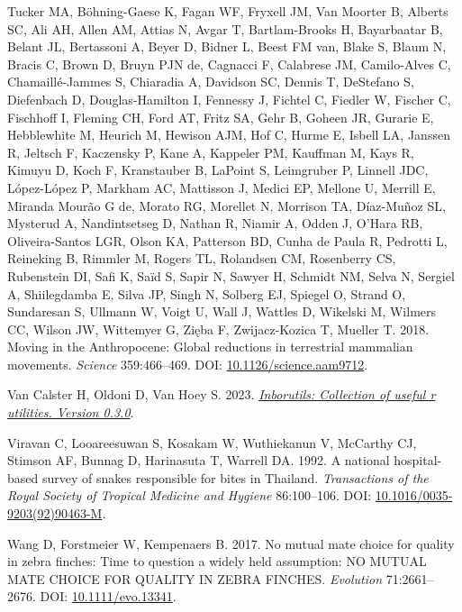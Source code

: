 \documentclass[10pt,a4paper]{article}
\newlength{\cslhangindent}
\newenvironment{CSLReferences}[2] %
 {\begin{list}{}{%
  \setlength{\itemindent}{0pt}
  \setlength{\leftmargin}{0pt}
  \setlength{\parsep}{0pt}
  \ifodd #1
   \setlength{\leftmargin}{\cslhangindent}
   \setlength{\itemindent}{-1\cslhangindent}
  \fi
  \setlength{\itemsep}{#2\baselineskip}}}
 {\end{list}}
\begin{document}
\begin{CSLReferences}{1}{0}
Tucker MA, Böhning-Gaese K, Fagan WF, Fryxell JM, Van Moorter B, Alberts SC, Ali AH, Allen AM, Attias N, Avgar T, Bartlam-Brooks H, Bayarbaatar B, Belant JL, Bertassoni A, Beyer D, Bidner L, Beest FM van, Blake S, Blaum N, Bracis C, Brown D, Bruyn PJN de, Cagnacci F, Calabrese JM, Camilo-Alves C, Chamaillé-Jammes S, Chiaradia A, Davidson SC, Dennis T, DeStefano S, Diefenbach D, Douglas-Hamilton I, Fennessy J, Fichtel C, Fiedler W, Fischer C, Fischhoff I, Fleming CH, Ford AT, Fritz SA, Gehr B, Goheen JR, Gurarie E, Hebblewhite M, Heurich M, Hewison AJM, Hof C, Hurme E, Isbell LA, Janssen R, Jeltsch F, Kaczensky P, Kane A, Kappeler PM, Kauffman M, Kays R, Kimuyu D, Koch F, Kranstauber B, LaPoint S, Leimgruber P, Linnell JDC, López-López P, Markham AC, Mattisson J, Medici EP, Mellone U, Merrill E, Miranda Mourão G de, Morato RG, Morellet N, Morrison TA, Díaz-Muñoz SL, Mysterud A, Nandintsetseg D, Nathan R, Niamir A, Odden J, O'Hara RB, Oliveira-Santos LGR, Olson KA, Patterson BD, Cunha de Paula R, Pedrotti L, Reineking B, Rimmler M, Rogers TL, Rolandsen CM, Rosenberry CS, Rubenstein DI, Safi K, Saïd S, Sapir N, Sawyer H, Schmidt NM, Selva N, Sergiel A, Shiilegdamba E, Silva JP, Singh N, Solberg EJ, Spiegel O, Strand O, Sundaresan S, Ullmann W, Voigt U, Wall J, Wattles D, Wikelski M, Wilmers CC, Wilson JW, Wittemyer G, Zięba F, Zwijacz-Kozica T, Mueller T. 2018. Moving in the {Anthropocene}: {Global} reductions in terrestrial mammalian movements. \emph{Science} 359:466--469. DOI: \href{https://doi.org/10.1126/science.aam9712}{10.1126/science.aam9712}.

Van Calster H, Oldoni D, Van Hoey S. 2023. \emph{\href{https://inbo.github.io/inborutils/}{Inborutils: Collection of useful r utilities. Version 0.3.0}}.

Viravan C, Looareesuwan S, Kosakam W, Wuthiekanun V, McCarthy CJ, Stimson AF, Bunnag D, Harinasuta T, Warrell DA. 1992. A national hospital-based survey of snakes responsible for bites in {Thailand}. \emph{Transactions of the Royal Society of Tropical Medicine and Hygiene} 86:100--106. DOI: \href{https://doi.org/10.1016/0035-9203(92)90463-M}{10.1016/0035-9203(92)90463-M}.

Wang D, Forstmeier W, Kempenaers B. 2017. No mutual mate choice for quality in zebra finches: {Time} to question a widely held assumption: {NO} {MUTUAL} {MATE} {CHOICE} {FOR} {QUALITY} {IN} {ZEBRA} {FINCHES}. \emph{Evolution} 71:2661--2676. DOI: \href{https://doi.org/10.1111/evo.13341}{10.1111/evo.13341}.


\end{CSLReferences}
\end{document}
